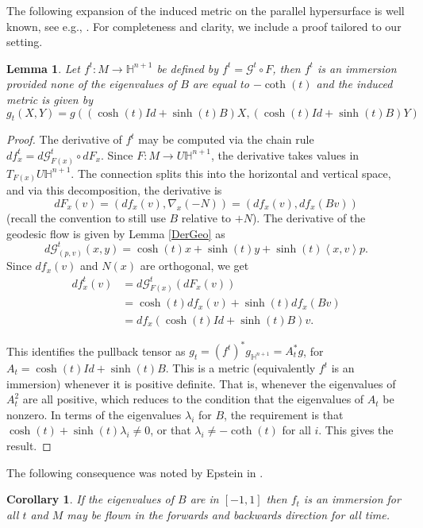 \documentclass{amsart}
\newtheorem{lem}[thm]{Lemma}
\newtheorem{cor}[thm]{Corollary}
\renewcommand{\H}{\mathbb{H}}
\begin{document}
The following expansion of the induced metric on the parallel hypersurface is well known, see e.g., \cite{Krasnov-Schlenker2007}.
For completeness and clarity, we include a proof tailored to our setting. 

\begin{lem}
Let $f^t: M \to \H^{n+1}$ be defined by $f^t = \mathcal{G}^t \circ F$, then $f^t$ is an immersion provided none of the eigenvalues of $B$ are equal to $-\coth(t)$ and the induced metric is given by 
\[
g_t(X,Y) = g( (\cosh(t)Id + \sinh(t)B)X, (\cosh(t)Id + \sinh(t)B)Y)
\]
\end{lem}

\begin{proof}
The derivative of $f^t$ may be computed via the chain rule $df^t_x = d\mathcal{G}^t_{F(x)} \circ dF_x$.
Since $F: M \to U\H^{n+1}$, the derivative takes values in $T_{F(x)}U\H^{n+1}$.
The connection splits this into the horizontal and vertical space, and via this decomposition, the derivative is 
\[
dF_x(v) = (df_x(v),\nabla_x(-N)) = (df_x(v),df_x(Bv))
\]
(recall the convention to still use $B$ relative to $+N$).
The derivative of the geodesic flow is given by Lemma \ref{DerGeo} as
\[
d\mathcal{G}^t_{(p,v)}(x,y) = \cosh(t)x + \sinh(t)y + \sinh(t)\left< x,v \right> p.
\]
Since $df_x(v)$ and $N(x)$ are orthogonal, we get
\begin{align*}
df^t_x(v) &= d\mathcal{G}^t_{F(x)}(dF_x(v)) \\
&= \cosh(t)df_x(v) + \sinh(t)df_x(Bv) \\
&= df_x(\cosh(t)Id + \sinh(t)B)v.
\end{align*}


This identifies the pullback tensor as $g_t = (f^t)^*g_{\H^{n+1}} = A_t^*g$, for $A_t = \cosh(t)Id + \sinh(t)B$.
This is a metric (equivalently $f^t$ is an immersion) whenever it is positive definite.
That is, whenever the eigenvalues of $A_t^2$ are all positive, which reduces to the condition that the eigenvalues of $A_t$ be nonzero. 
In terms of the eigenvalues $\lambda_i$ for $B$, the requirement is that $\cosh(t) + \sinh(t)\lambda_i \neq 0$, or that $\lambda_i \neq -\coth(t)$ for all $i$. 
This gives the result.
\end{proof}

The following consequence was noted by Epstein in \cite{Epstein1984}.

\begin{cor}
If the eigenvalues of $B$ are in $[-1,1]$ then $f_t$ is an immersion for all $t$ and $M$ may be flown in the forwards and backwards direction for all time. 
\end{cor}
\end{document}
